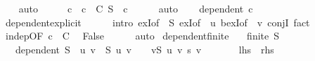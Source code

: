 \begin{isabellebody}
\ \ \isamarkupfalse%
\ auto\isanewline
\ \ \isamarkupfalse%
\ \isamarkupfalse%
\ c\ \ {\isachardoublequoteopen}c\ {\isasymin}\ C{\isachardoublequoteclose}\ {\isachardoublequoteopen}S\ {\isasymsubseteq}\ c{\isachardoublequoteclose}\isanewline
\ \ \ \ \isamarkupfalse%
\ auto\isanewline
\ \ \isamarkupfalse%
\ {\isachardoublequoteopen}dependent\ c{\isachardoublequoteclose}\isanewline
\ \ \ \ \isamarkupfalse%
\ dependent{\isacharunderscore}{\kern0pt}explicit\isanewline
\ \ \ \ \isamarkupfalse%
\ {\isacharparenleft}{\kern0pt}intro\ exI{\isacharbrackleft}{\kern0pt}of\ {\isacharunderscore}{\kern0pt}\ S{\isacharbrackright}{\kern0pt}\ exI{\isacharbrackleft}{\kern0pt}of\ {\isacharunderscore}{\kern0pt}\ u{\isacharbrackright}{\kern0pt}\ bexI{\isacharbrackleft}{\kern0pt}of\ {\isacharunderscore}{\kern0pt}\ v{\isacharbrackright}{\kern0pt}\ conjI{\isacharparenright}{\kern0pt}\ fact{\isacharplus}{\kern0pt}\isanewline
\ \ \isamarkupfalse%
\ indep{\isacharbrackleft}{\kern0pt}OF\ {\isacartoucheopen}c\ {\isasymin}\ C{\isacartoucheclose}{\isacharbrackright}{\kern0pt}\ \isamarkupfalse%
\ False\isanewline
\ \ \ \ \isamarkupfalse%
\ auto\isanewline
{}\isamarkupfalse%
%
\endisatagproof
{\isafoldproof}%
%
\isadelimproof
\isanewline
%
\endisadelimproof
\isanewline
{}\isamarkupfalse%
\ dependent{\isacharunderscore}{\kern0pt}finite{\isacharcolon}{\kern0pt}\isanewline
\ \ \ {\isachardoublequoteopen}finite\ S{\isachardoublequoteclose}\isanewline
\ \ \ {\isachardoublequoteopen}dependent\ S\ {\isasymlongleftrightarrow}\ {\isacharparenleft}{\kern0pt}{\isasymexists}u{\isachardot}{\kern0pt}\ {\isacharparenleft}{\kern0pt}{\isasymexists}v\ {\isasymin}\ S{\isachardot}{\kern0pt}\ u\ v\ {\isasymnoteq}\ {}{\isacharparenright}{\kern0pt}\ {\isasymand}\ {\isacharparenleft}{\kern0pt}{\isasymSum}v{\isasymin}S{\isachardot}{\kern0pt}\ u\ v\ {\isacharasterisk}{\kern0pt}s\ v{\isacharparenright}{\kern0pt}\ {\isacharequal}{\kern0pt}\ {}{\isacharparenright}{\kern0pt}{\isachardoublequoteclose}\isanewline
\ \ \ \ {\isacharparenleft}{\kern0pt}\ {\isachardoublequoteopen}{\isacharquery}{\kern0pt}lhs\ {\isacharequal}{\kern0pt}\ {\isacharquery}{\kern0pt}rhs{\isachardoublequoteclose}{\isacharparenright}{\kern0pt}\isanewline
%
\isadelimproof
%
\endisadelimproof
%
\isatagproof
{}\isamarkupfalse%
\isanewline
\ \ \isamarkupfalse%

\end{isabellebody}
